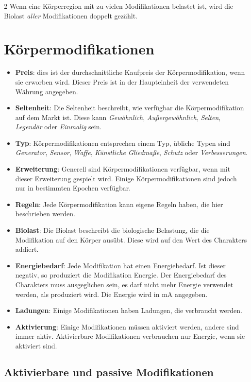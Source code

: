 \begin{multicols}{2}
Wenn eine Körperregion mit zu vielen Modifikationen belastet ist, wird die Biolast \textit{aller} Modifikationen doppelt gezählt.

\section{Körpermodifikationen}
\begin{itemize}
    \item \textbf{Preis}: dies ist der durchschnittliche Kaufpreis der Körpermodifikation, wenn sie erworben wird. Dieser Preis ist in der Haupteinheit der verwendeten Währung angegeben.
    \item \textbf{Seltenheit}: Die Seltenheit beschreibt, wie verfügbar die Körpermodifikation auf dem Markt ist. Diese kann \textit{Gewöhnlich}, \textit{Außergewöhnlich}, \textit{Selten}, \textit{Legendär} oder \textit{Einmalig} sein.
    \item \textbf{Typ}: Körpermodifikationen entsprechen einem Typ, übliche Typen sind \textit{Generator}, \textit{Sensor}, \textit{Waffe}, \textit{Künstliche Gliedmaße}, \textit{Schutz} oder \textit{Verbesserungen}.
    \item \textbf{Erweiterung}: Generell sind Körpermodifikationen verfügbar, wenn mit dieser Erweiterung gespielt wird. Einige Körpermodifikationen sind jedoch nur in bestimmten Epochen verfügbar.
    \item \textbf{Regeln}: Jede Körpermodifikation kann eigene Regeln haben, die hier beschrieben werden.
    \item \textbf{Biolast}: Die Biolast beschreibt die biologische Belastung, die die Modifikation auf den Körper ausübt. Diese wird auf den Wert des Charakters addiert.
    \item \textbf{Energiebedarf}: Jede Modifikation hat einen Energiebedarf. Ist dieser negativ, so produziert die Modifikation Energie. Der Energiebedarf des Charakters muss ausgeglichen sein, es darf nicht mehr Energie verwendet werden, als produziert wird. Die Energie wird in mA angegeben.
    \item \textbf{Ladungen}: Einige Modifikationen haben Ladungen, die verbraucht werden.
    \item \textbf{Aktivierung}: Einige Modifikationen müssen aktiviert werden, andere sind immer aktiv. Aktivierbare Modifikationen verbrauchen nur Energie, wenn sie aktiviert sind.
\end{itemize}

\subsection{Aktivierbare und passive Modifikationen}


\end{multicols}
